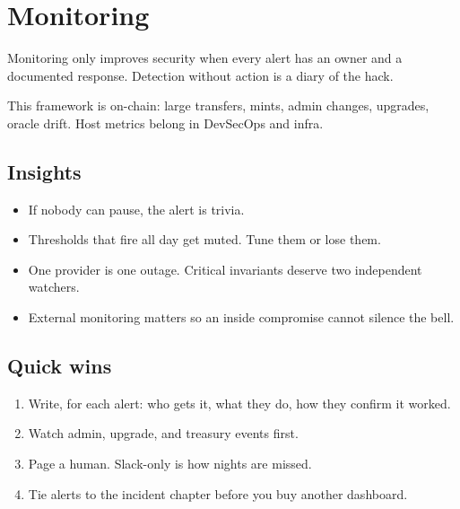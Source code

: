 \chapter{Monitoring}

Monitoring only improves security when every alert has
an owner and a documented response. Detection without
action is a diary of the hack.

This framework is on-chain: large transfers, mints,
admin changes, upgrades, oracle drift. Host metrics
belong in DevSecOps and infra.

\section{Insights}

\begin{itemize}
  \item If nobody can pause, the alert is trivia.
  \item Thresholds that fire all day get muted. Tune
  them or lose them.
  \item One provider is one outage. Critical invariants
  deserve two independent watchers.
  \item External monitoring matters so an inside
  compromise cannot silence the bell.
\end{itemize}

\section{Quick wins}

\begin{enumerate}
  \item Write, for each alert: who gets it, what they
  do, how they confirm it worked.
  \item Watch admin, upgrade, and treasury events first.
  \item Page a human. Slack-only is how nights are
  missed.
  \item Tie alerts to the incident chapter before you
  buy another dashboard.
\end{enumerate}
